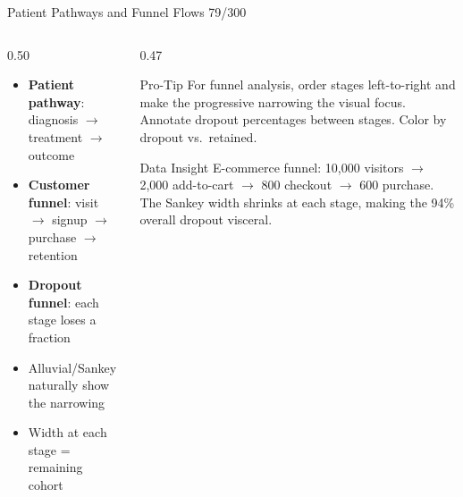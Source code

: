 \documentclass[10pt]{beamer}
\newcommand{\smark}[1]{\hfill{\scriptsize\color{codegray}#1}}
\begin{document}
\begin{frame}{Patient Pathways and Funnel Flows}
\smark{79/300}
\begin{columns}[T]
\begin{column}{0.50\textwidth}
\begin{itemize}
    \item \textbf{Patient pathway}: diagnosis $\to$ treatment $\to$ outcome
    \item \textbf{Customer funnel}: visit $\to$ signup $\to$ purchase $\to$ retention
    \item \textbf{Dropout funnel}: each stage loses a fraction
    \item Alluvial/Sankey naturally show the narrowing
    \item Width at each stage = remaining cohort
\end{itemize}
\end{column}
\begin{column}{0.47\textwidth}
\begin{alertblock}{Pro-Tip}
    \scriptsize For funnel analysis, order stages left-to-right and make the progressive narrowing the visual focus. Annotate dropout percentages between stages. Color by dropout vs.\ retained.
\end{alertblock}
\vspace{0.1cm}
\begin{exampleblock}{Data Insight}
    \scriptsize E-commerce funnel: 10{,}000 visitors $\to$ 2{,}000 add-to-cart $\to$ 800 checkout $\to$ 600 purchase. The Sankey width shrinks at each stage, making the 94\% overall dropout visceral.
\end{exampleblock}
\end{column}
\end{columns}
\end{frame}
\end{document}
